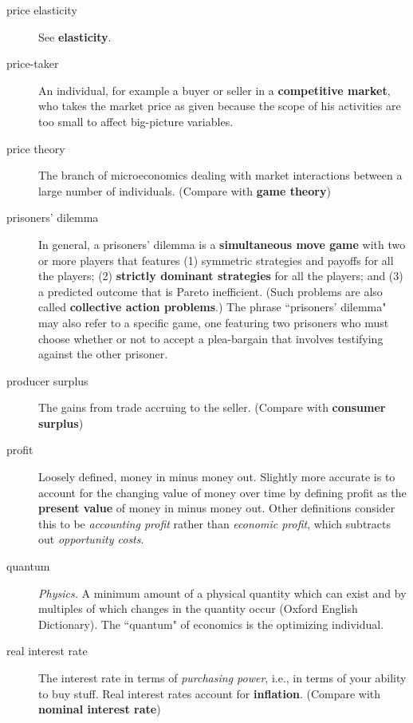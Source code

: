 \begin{description}
\item[price elasticity] See \textbf{elasticity}.

\item[price-taker] An individual, for example a buyer or seller in a \textbf{competitive market}, who takes the market price as given because the scope of his activities are too small to affect big-picture variables.

\item[price theory] The branch of microeconomics dealing with market interactions between a large number of individuals. (Compare with \textbf{game theory})

\item[prisoners' dilemma] In general, a prisoners' dilemma is a \textbf{simultaneous move game} with two or more players that features (1) symmetric strategies and payoffs for all the players; (2) \textbf{strictly dominant strategies} for all the players; and (3) a predicted outcome that is Pareto inefficient. (Such problems are also called \textbf{collective action problems}.) The phrase ``prisoners' dilemma" may also refer to a specific game, one featuring two prisoners who must choose whether or not to accept a plea-bargain that involves testifying against the other prisoner.  

\item[producer surplus] The gains from trade accruing to the seller. (Compare with \textbf{consumer surplus})

\item[profit] Loosely defined, money in minus money out. Slightly more accurate is to account for the changing value of money over time by defining profit as the \textbf{present value} of money in minus money out. Other definitions consider this to be \emph{accounting profit} rather than \emph{economic profit}, which subtracts out \emph{opportunity costs}.

\item[quantum] \textit{Physics.} A minimum amount of a physical quantity which can exist and by multiples of which changes in the quantity occur (Oxford English Dictionary). The ``quantum" of economics is the optimizing individual. 

\item[real interest rate] The interest rate in terms of \emph{purchasing power}, i.e., in terms of your ability to buy stuff. Real interest rates account for \textbf{inflation}. (Compare with \textbf{nominal interest rate})


\end{description}
